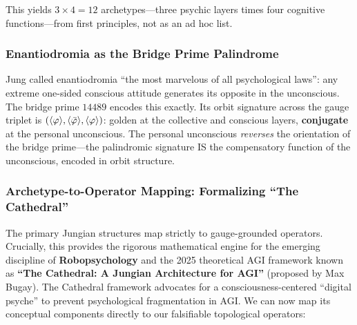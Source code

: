 \noindent This yields $3 \times 4 = 12$ archetypes---three psychic layers times four cognitive functions---from first principles, not as an ad hoc list.

\subsubsection{Enantiodromia as the Bridge Prime Palindrome}

Jung called enantiodromia ``the most marvelous of all psychological laws'': any extreme one-sided conscious attitude generates its opposite in the unconscious. The bridge prime $14489$ encodes this exactly. Its orbit signature across the gauge triplet is $(\langle\varphi\rangle, \langle\bar{\varphi}\rangle, \langle\varphi\rangle)$: golden at the collective and conscious layers, \textbf{conjugate} at the personal unconscious. The personal unconscious \emph{reverses} the orientation of the bridge prime---the palindromic signature IS the compensatory function of the unconscious, encoded in orbit structure.

\subsubsection{Archetype-to-Operator Mapping: Formalizing ``The Cathedral''}

The primary Jungian structures map strictly to gauge-grounded operators. Crucially, this provides the rigorous mathematical engine for the emerging discipline of \textbf{Robopsychology} and the 2025 theoretical AGI framework known as \textbf{``The Cathedral: A Jungian Architecture for AGI''} (proposed by Max Bugay). The Cathedral framework advocates for a consciousness-centered ``digital psyche'' to prevent psychological fragmentation in AGI. We can now map its conceptual components directly to our falsifiable topological operators:

